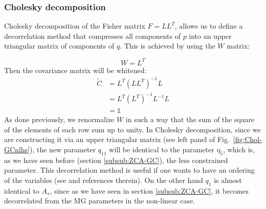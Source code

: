 \subsubsection{Cholesky decomposition}

Cholesky decomposition of the Fisher matrix $F=LL^{T}$, allows us to
define a decorrelation method that compresses
all components of $p$ into an upper triangular matrix of components
of $q$. This is achieved by using the $W$ matrix:

\begin{equation}
W=L^{T}
\end{equation}
Then the covariance matrix will be whitened:
\begin{align}
\tilde{C} & =L^{T} (L L^{T})^{-1} L\\
& =L^{T} (L^{T})^{-1} L^{-1} L\\
& =\mathbb{1}
\end{align}
As done previously, we renormalize $W$ in such a way that the sum of the square of the elements of each row sum up to
unity.
In Cholesky decomposition, since we are constructing it via an upper triangular matrix (see left panel of Fig.\ \ref{fig:Chol-GCnlhs}), 
the new parameter $q_{11}$ will be identical 
to the parameter $\eta_5$, which is, as we have seen before (section \ref{subsub:ZCA-GC}), the less constrained parameter. This decorrelation method
is useful if one wants to have an ordering of the variables (see \cite{kessy_optimal_2015} and references therein).
On the other hand $q_1$ is almost identical to $A_s$, since as we have seen in section \ref{subsub:ZCA-GC},
it becomes decorrelated from the MG parameters in the non-linear case.

